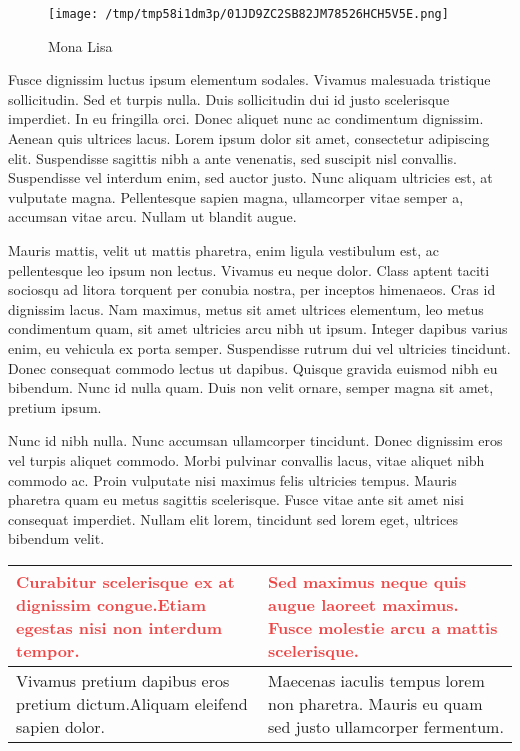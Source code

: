 \documentclass[12pt,a4paper]{article}%
\begin{document}
\begin{figure}[h!]%
\centering%
\texttt{[image: /tmp/tmp58i1dm3p/01JD9ZC2SB82JM78526HCH5V5E.png]}%
\caption{Mona Lisa}%
\end{figure}

%
Fusce dignissim luctus ipsum elementum sodales. Vivamus malesuada tristique sollicitudin. Sed et turpis nulla. Duis sollicitudin dui id justo scelerisque imperdiet. In eu fringilla orci. Donec aliquet nunc ac condimentum dignissim. Aenean quis ultrices lacus. Lorem ipsum dolor sit amet, consectetur adipiscing elit. Suspendisse sagittis nibh a ante venenatis, sed suscipit nisl convallis. Suspendisse vel interdum enim, sed auctor justo. Nunc aliquam ultricies est, at vulputate magna. Pellentesque sapien magna, ullamcorper vitae semper a, accumsan vitae arcu. Nullam ut blandit augue.%
\begin{justify}%
Mauris mattis, velit ut mattis pharetra, enim ligula vestibulum est, ac pellentesque leo ipsum non lectus. Vivamus eu neque dolor. Class aptent taciti sociosqu ad litora torquent per conubia nostra, per inceptos himenaeos. Cras id dignissim lacus. Nam maximus, metus sit amet ultrices elementum, leo metus condimentum quam, sit amet ultricies arcu nibh ut ipsum. Integer dapibus varius enim, eu vehicula ex porta semper. Suspendisse rutrum dui vel ultricies tincidunt. Donec consequat commodo lectus ut dapibus. Quisque gravida euismod nibh eu bibendum. Nunc id nulla quam. Duis non velit ornare, semper magna sit amet, pretium ipsum.%
\end{justify}%
\begin{justify}%
Nunc id nibh nulla. Nunc accumsan ullamcorper tincidunt. Donec dignissim eros vel turpis aliquet commodo. Morbi pulvinar convallis lacus, vitae aliquet nibh commodo ac. Proin vulputate nisi maximus felis ultricies tempus. Mauris pharetra quam eu metus sagittis scelerisque. Fusce vitae ante sit amet nisi consequat imperdiet. Nullam elit lorem, tincidunt sed lorem eget, ultrices bibendum velit.%
\end{justify}%


\begin{table}[h!]%
\centering%
\begin{tabular}{p{0.5\linewidth} p{0.5\linewidth}}%
\hline%
\textcolor[HTML]{ef4444}{\textbf{Curabitur scelerisque ex at dignissim congue.}}\newline \textcolor[HTML]{ef4444}{\textbf{Etiam egestas nisi non interdum tempor.}}&\textcolor[HTML]{ef4444}{\textbf{Sed maximus neque quis augue laoreet maximus. Fusce molestie arcu a mattis scelerisque. }}\\%
\hline%
Vivamus pretium dapibus eros pretium dictum.\newline Aliquam eleifend sapien dolor. &Maecenas iaculis tempus lorem non pharetra. Mauris eu quam sed justo ullamcorper fermentum.\\%
\hline%
\end{tabular}%
\end{table}
\end{document}
